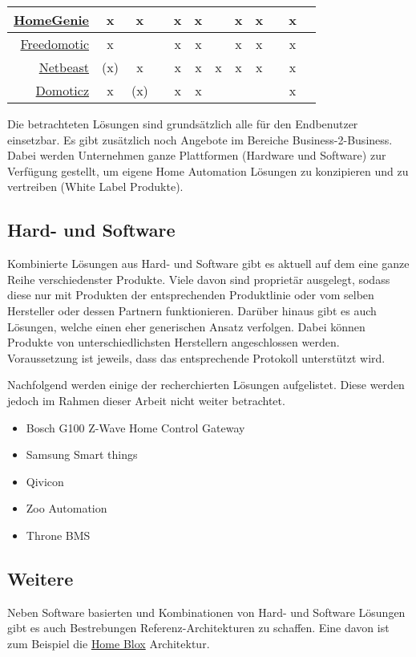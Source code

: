 \begin{table}[H]
\begin{tabular}{r | c  | c | c | c | c | c | c | c | c | c | c}
\midrule 
\hyperlink{http://www.homegenie.it/}{HomeGenie}
	& x
	& x
	& 
	& x
	& x
	& 
	& x
	& x
	& 
	& x\\
	
\midrule
\hyperlink{http://www.freedomotic.com/}{Freedomotic}
	& x
	& 
	& 
	& x\footnotemark[1]
	& x
	& 
	& x
	& x
	& 
	& x\\
	
\midrule
\hyperlink{https://netbeast.co/}{Netbeast}
	& (x)
	& x
	& 
	& x
	& x
	& x
	& x
	& x
	& 
	& x\\
	
\midrule
\hyperlink{http://www.domoticz.com/}{Domoticz}
	& x
	& (x)
	& 
	& x
	& x
	& 
	& \footnotemark[2]
	& \footnotemark[2]
	& 
	& x\\
\bottomrule
\end{tabular}
\end{table}


Die betrachteten Lösungen sind grundsätzlich alle für den Endbenutzer einsetzbar. Es gibt zusätzlich noch Angebote im Bereiche Business-2-Business. Dabei werden Unternehmen ganze Plattformen (Hardware und Software) zur Verfügung gestellt, um eigene Home Automation Lösungen zu konzipieren und zu vertreiben (White Label Produkte).

\subsection{Hard- und Software}
Kombinierte Lösungen aus Hard- und Software gibt es aktuell auf dem eine ganze Reihe verschiedenster Produkte. Viele davon sind proprietär ausgelegt, sodass diese nur mit Produkten der entsprechenden Produktlinie oder vom selben Hersteller oder dessen Partnern funktionieren. Darüber hinaus gibt es auch Lösungen, welche einen eher generischen Ansatz verfolgen. Dabei können Produkte von unterschiedlichsten Herstellern angeschlossen werden. Voraussetzung ist jeweils, dass das entsprechende Protokoll unterstützt wird.

Nachfolgend werden einige der recherchierten Lösungen aufgelistet. Diese werden jedoch im Rahmen dieser Arbeit nicht weiter betrachtet.

\begin{itemize}
\item Bosch G100 Z-Wave Home Control Gateway
\item Samsung Smart things
\item Qivicon
\item Zoo Automation
\item Throne BMS
\end{itemize}

\subsection{Weitere}
Neben Software basierten und Kombinationen von Hard- und Software Lösungen gibt es auch Bestrebungen Referenz-Architekturen zu schaffen. Eine davon ist zum Beispiel die  \hyperlink{http://www.ubicomp.org/ubicomp2013/adjunct/adjunct/p801.pdf}{Home Blox} Architektur.


